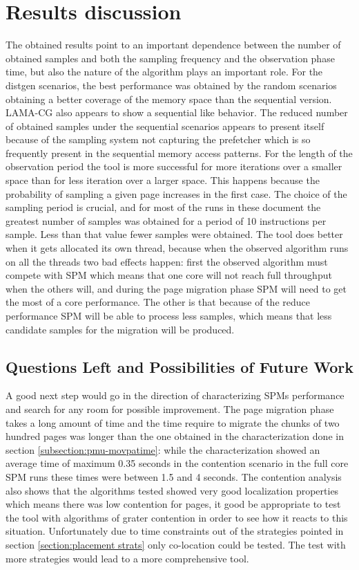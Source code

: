 \section{Results discussion}\label{section:resdiscussion}
The obtained results point to an important dependence between the number of obtained samples and both the sampling frequency and the observation phase time, but also the nature of the algorithm plays an important role. For the distgen scenarios, the best performance was obtained by the random scenarios obtaining a better coverage of the memory space than the sequential version. LAMA-CG also appears to show a sequential like behavior. The reduced number of obtained samples under the sequential scenarios appears to present itself because of the sampling system not capturing the prefetcher which is so frequently present in the sequential memory access patterns. For the length of the observation period the tool is more successful for more iterations over a smaller space than for less iteration over a larger space. This happens because the probability of sampling a given page increases in the first case. 
The choice of the sampling period is crucial, and for most of the runs in these document the greatest number of samples was obtained for a period of 10 instructions per sample. Less than that value fewer samples were obtained. The tool does better when it gets allocated its own thread, because when the observed algorithm runs on all the threads two bad effects happen: first the observed algorithm must compete with SPM which means that one core will not reach full throughput when the others will, and during the page migration phase SPM will need to get the most of a core performance. The other is that because of the reduce performance SPM will be able to process less samples, which means that less candidate samples for the migration will be produced.

\subsection{Questions Left and Possibilities of Future Work}\label{subsection:resfutwork}


A good next step would go in the direction of characterizing SPMs performance and search for any room for possible improvement. The page migration phase takes a long amount of time and the time require to migrate the chunks of two hundred pages was longer than the one obtained in the characterization done in section \ref{subsection:pmu-movpatime}: while the characterization showed an average time of maximum 0.35 seconds in the contention scenario in the full core SPM runs these times were between 1.5 and 4 seconds. 
The contention analysis also shows that the algorithms tested showed very good localization properties which means there was low contention for pages, it good be appropriate to test the tool with algorithms of grater contention in order to see how it reacts to this situation.
Unfortunately due to time constraints out of the strategies pointed in section \ref{section:placement strats} only co-location could be tested. The test with more strategies would lead to a more comprehensive tool.
